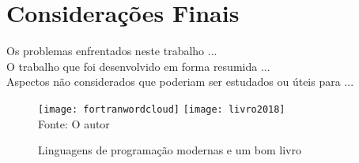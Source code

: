 

\chapter{Considera\c{c}\~{o}es Finais}
Os problemas enfrentados neste trabalho ...\\
O trabalho que foi desenvolvido em forma resumida ...\\
Aspectos n\~{a}o considerados que poderiam ser estudados ou \'{u}teis para ...\\
   \begin{figure}[H]
    \begin{center}
        \caption{Linguagens de programa\c{c}\~{a}o modernas e um bom livro} \label{ling2}
        \texttt{[image: fortranwordcloud]}
        \texttt{[image: livro2018]} \\
        {\tiny \sf Fonte: O autor }
    \end{center}
   \end{figure} 